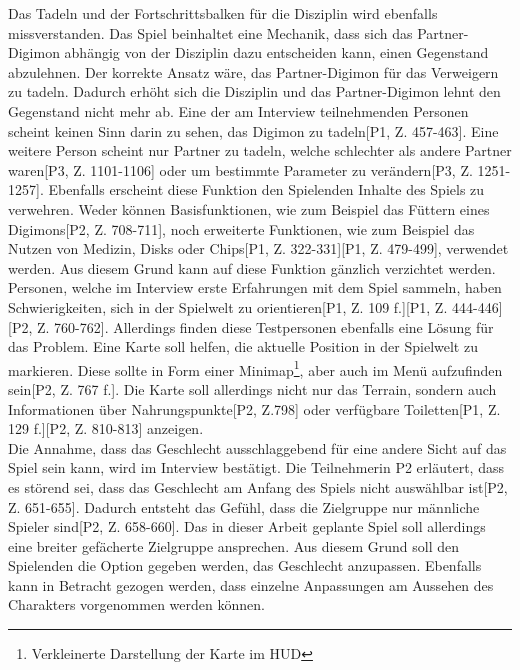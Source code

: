 Das Tadeln und der Fortschrittsbalken für die Disziplin wird ebenfalls missverstanden. Das Spiel beinhaltet eine Mechanik, dass sich das Partner-Digimon abhängig von der Disziplin dazu entscheiden kann, einen Gegenstand abzulehnen. Der korrekte Ansatz wäre, das Partner-Digimon für das Verweigern zu tadeln. Dadurch erhöht sich die Disziplin und das Partner-Digimon lehnt den Gegenstand nicht mehr ab. Eine der am Interview teilnehmenden Personen scheint keinen Sinn darin zu sehen, das Digimon zu tadeln[P1, Z. 457-463]. Eine weitere Person scheint nur Partner zu tadeln, welche schlechter als andere Partner waren[P3, Z. 1101-1106] oder um bestimmte Parameter zu verändern[P3, Z. 1251-1257]. Ebenfalls erscheint diese Funktion den Spielenden Inhalte des Spiels zu verwehren. Weder können Basisfunktionen, wie zum Beispiel das Füttern eines Digimons[P2, Z. 708-711], noch erweiterte Funktionen, wie zum Beispiel das Nutzen von Medizin, Disks oder Chips[P1, Z. 322-331][P1, Z. 479-499], verwendet werden. Aus diesem Grund kann auf diese Funktion gänzlich verzichtet werden\hypothesis.\\

Personen, welche im Interview erste Erfahrungen mit dem Spiel sammeln, haben Schwierigkeiten, sich in der Spielwelt zu orientieren[P1, Z. 109 f.][P1, Z. 444-446][P2, Z. 760-762]. Allerdings finden diese Testpersonen ebenfalls eine Lösung für das Problem. Eine Karte soll helfen, die aktuelle Position in der Spielwelt zu markieren\hypothesis[P1, Z. 172-175][P1, Z. 521-524][P2, Z. 765]. Diese sollte in Form einer Minimap\footnote{Verkleinerte Darstellung der Karte im \ac{HUD}}, aber auch im Menü aufzufinden sein[P2, Z. 767 f.]. Die Karte soll allerdings nicht nur das Terrain, sondern auch Informationen über Nahrungspunkte[P2, Z.798] oder verfügbare Toiletten[P1, Z. 129 f.][P2, Z. 810-813] anzeigen\hypothesis.\\

Die Annahme, dass das Geschlecht ausschlaggebend für eine andere Sicht auf das Spiel sein kann, wird im Interview bestätigt. Die Teilnehmerin P2 erläutert, dass es störend sei, dass das Geschlecht am Anfang des Spiels nicht auswählbar ist[P2, Z. 651-655]. Dadurch entsteht das Gefühl, dass die Zielgruppe nur männliche Spieler sind[P2, Z. 658-660]. Das in dieser Arbeit geplante Spiel soll allerdings eine breiter gefächerte Zielgruppe ansprechen. Aus diesem Grund soll den Spielenden die Option gegeben werden, das Geschlecht anzupassen\hypothesis. Ebenfalls kann in Betracht gezogen werden, dass einzelne Anpassungen am Aussehen des Charakters vorgenommen werden können\hypothesis[P2, Z. 665-668]. \\

